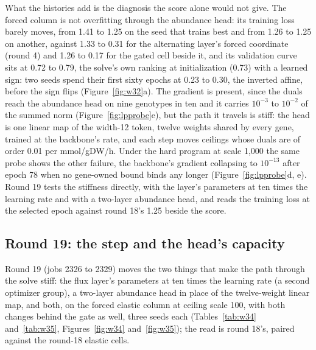 What the histories add is the diagnosis the score alone would not give. The forced
column is not overfitting through the abundance head: its training loss barely moves,
from 1.41 to 1.25 on the seed that trains best and from 1.26 to 1.25 on another, against
1.33 to 0.31 for the alternating layer's forced coordinate (round 4) and 1.26 to 0.17
for the gated cell beside it, and its validation curve sits at 0.72 to 0.79, the solve's
own ranking at initialization (0.73) with a learned sign: two seeds spend their first
sixty epochs at 0.23 to 0.30, the inverted affine, before the sign flips
(Figure~\ref{fig:w32}a). The gradient is present, since the duals reach the abundance
head on nine genotypes in ten and it carries $10^{-3}$ to $10^{-2}$ of the summed norm
(Figure~\ref{fig:lpprobe}e), but the path it travels is stiff: the head is one linear
map of the width-12 token, twelve weights shared by every gene, trained at the
backbone's rate, and each step moves ceilings whose duals are of order 0.01 per
mmol/gDW/h. Under the hard program at scale 1,000 the same probe shows the other
failure, the backbone's gradient collapsing to $10^{-13}$ after epoch 78 when no
gene-owned bound binds any longer (Figure~\ref{fig:lpprobe}d, e). Round 19 tests the
stiffness directly, with the layer's parameters at ten times the learning rate and with
a two-layer abundance head, and reads the training loss at the selected epoch against
round 18's 1.25 beside the score.

\subsection{Round 19: the step and the head's capacity}
\label{sec:round19}

Round 19 (jobs 2326 to 2329) moves the two things that make the path through the
solve stiff: the flux layer's parameters at ten times the learning rate (a second
optimizer group), a two-layer abundance head in place of the twelve-weight linear map,
and both, on the forced elastic column at ceiling scale 100, with both changes behind
the gate as well, three seeds each (Tables~\ref{tab:w34} and~\ref{tab:w35},
Figures~\ref{fig:w34} and~\ref{fig:w35}); the read is round 18's, paired against the
round-18 elastic cells.




